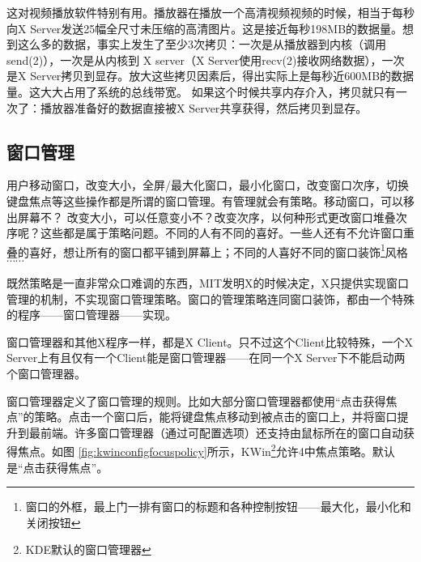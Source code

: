 \documentclass[amstex,twoside]{ctexbook}
\newenvironment{notice}{\tt}{}
\begin{document}
\begin{notice}


这对视频播放软件特别有用。播放器在播放一个高清视频视频的时候，相当于每秒向X Server发送25幅全尺寸未压缩的高清图片。这是接近每秒198MB的数据量。想到这么多的数据，事实上发生了至少3次拷贝：一次是从播放器到内核（调用send(2)），一次是从内核到
X server（X Server使用recv(2)接收网络数据），一次是X Server拷贝到显存。放大这些拷贝因素后，得出实际上是每秒近600MB的数据量。这大大占用了系统的总线带宽。
如果这个时候共享内存介入，拷贝就只有一次了：播放器准备好的数据直接被X Server共享获得，然后拷贝到显存。



\end{notice}

\subsection{窗口管理}

用户移动窗口，改变大小，全屏/最大化窗口，最小化窗口，改变窗口次序，切换键盘焦点等这些操作都是所谓的窗口管理。有管理就会有策略。移动窗口，可以移出屏幕不？
改变大小，可以任意变小不？改变次序，以何种形式更改窗口堆叠次序呢？这些都是属于策略问题。不同的人有不同的喜好。一些人还有不允许窗口重叠的喜好，想让所有的窗口都平铺到屏幕上；不同的人喜好不同的窗口装饰\footnote{窗口的外框，最上门一排有窗口的标题和各种控制按钮——最大化，最小化和关闭按钮}风格$\cdots\cdots$

既然策略是一直非常众口难调的东西，MIT发明X的时候决定，X只提供实现窗口管理的机制，不实现窗口管理策略。窗口的管理策略连同窗口装饰，都由一个特殊的程序——窗口管理器——实现。

窗口管理器和其他X程序一样，都是X Client。只不过这个Client比较特殊，一个X Server上有且仅有一个Client能是窗口管理器——在同一个X Server下不能启动两个窗口管理器。


窗口管理器定义了窗口管理的规则。比如大部分窗口管理器都使用“点击获得焦点”的策略。点击一个窗口后，能将键盘焦点移动到被点击的窗口上，并将窗口提升到最前端。许多窗口管理器（通过可配置选项）还支持由鼠标所在的窗口自动获得焦点。如图 \ref{fig:kwinconfigfocuspolicy}所示，KWin\footnote{KDE默认的窗口管理器}允许4中焦点策略。默认是“点击获得焦点”。

\end{document}
